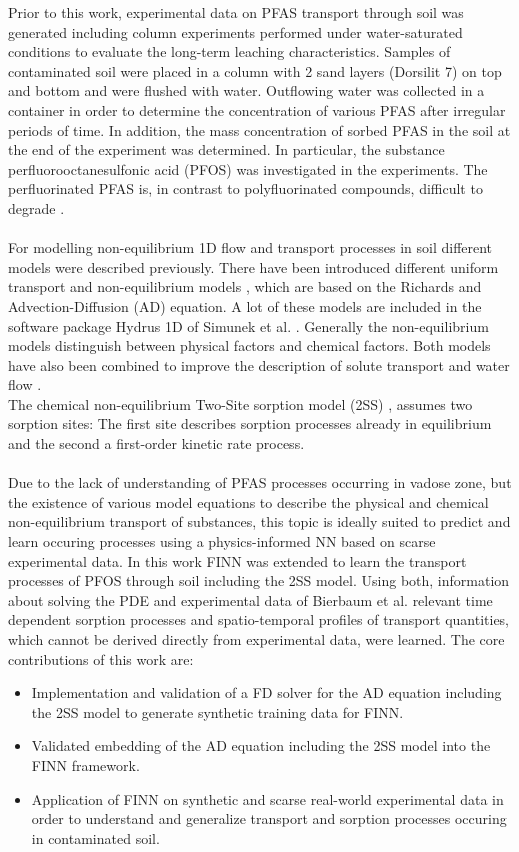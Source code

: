 Prior to this work, experimental data on PFAS transport through soil was generated \cite{Bierbaum2022Mar} including column experiments performed under water-saturated conditions to evaluate the long-term leaching characteristics. Samples of contaminated soil were placed in a column with 2 sand layers (Dorsilit 7) on top and bottom and were flushed with water. Outflowing water was collected in a container in order to determine the concentration of various PFAS after irregular periods of time. In addition, the mass concentration of sorbed PFAS in the soil at the end of the experiment was determined. In particular, the substance perfluorooctanesulfonic acid (PFOS) was investigated in the experiments. The perfluorinated PFAS is, in contrast to polyfluorinated compounds, difficult to degrade \cite{Leung2022Jun}.\\
\\
For modelling non-equilibrium 1D flow and transport processes in soil different models were described previously. There have been introduced different uniform transport \cite{Nkedi-Kizza1984Aug} and non-equilibrium models \cite{VanGenuchten1981, Toride1993Jul}, which are based on the Richards \cite{Richards1931Nov} and Advection-Diffusion (AD) equation. A lot of these models are included in the software package Hydrus 1D of Simunek et al. \cite{Simunek2008May}. Generally the non-equilibrium models distinguish between physical factors and chemical factors. Both models have also been combined to improve the description of solute transport and water flow \cite{Dam1997}.\\
The chemical non-equilibrium Two-Site sorption model (2SS) \cite{SelimH1976, vanGenuchten1989Sep}, assumes two sorption sites: The first site describes sorption processes already in equilibrium and the second a first-order kinetic rate process.\\
\\
Due to the lack of understanding of PFAS processes occurring in vadose zone, but the existence of various model equations to describe the physical and chemical non-equilibrium transport of substances, this topic is ideally suited to predict and learn occuring processes using a physics-informed NN based on scarse experimental data. In this work FINN was extended to learn the transport processes of PFOS through soil including the 2SS model. Using both, information about solving the PDE and experimental data of Bierbaum et al. relevant time dependent sorption processes and spatio-temporal profiles of transport quantities, which cannot be derived directly from experimental data, were learned. The core contributions of this work are:
\begin{itemize}
    \item Implementation and validation of a FD solver for the AD equation including the 2SS model to generate synthetic training data for FINN.
    \item Validated embedding of the AD equation including the 2SS model into the FINN framework.
    \item Application of FINN on synthetic and scarse real-world experimental data in order to understand and generalize transport and sorption processes occuring in contaminated soil.
\end{itemize}